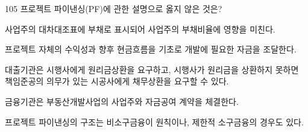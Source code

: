 \begin{question}{105}
프로젝트 파이낸싱(PF)에 관한 설명으로 옳지 않은 것은?
\begin{choices}
  \item 사업주의 대차대조표에 부채로 표시되어 사업주의 부채비율에 영향을 미친다.
  \item 프로젝트 자체의 수익성과 향후 현금흐름을 기초로 개발에 필요한 자금을 조달한다.
  \item 대출기관은 시행사에게 원리금상환을 요구하고, 시행사가 원리금을 상환하지 못하면 책임준공의 의무가 있는 시공사에게 채무상환을 요구할 수 있다.
  \item 금융기관은 부동산개발사업의 사업주와 자금공여 계약을 체결한다.
  \item 프로젝트 파이낸싱의 구조는 비소구금융이 원칙이나, 제한적 소구금융의 경우도 있다.
\end{choices}
\end{question}

